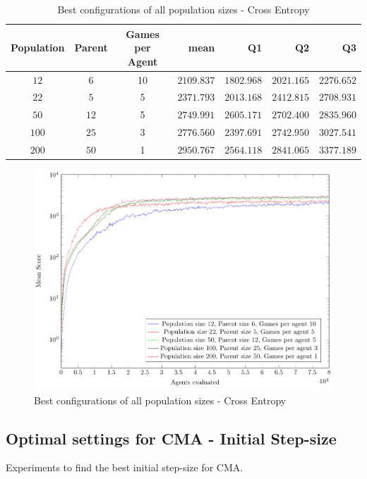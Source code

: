 \clearpage

\begin{table}[H]
\centering
\small
\begin{tabular}{c c c r r r r}
Population & Parent & Games per Agent & mean & Q1 & Q2 & Q3\\
\hline
$12$ & $6$ & 10 & $2109.837$ & $1802.968$ & $2021.165$ & $2276.652$\\
$22$ & $5$ & 5 & $2371.793$ & $2013.168$ & $2412.815$ & $2708.931$\\
$50$ & $12$ & 5 & $2749.991$ & $2605.171$ & $2702.400$ & $2835.960$\\
$100$ & $25$ & 3 & $2776.560$ & $2397.691$ & $2742.950$ & $3027.541$\\
$200$ & $50$ & 1 & $2950.767$ & $2564.118$ & $2841.065$ & $3377.189$\\
\end{tabular}
\caption{Best configurations of all population sizes - Cross Entropy}
\end{table}

\begin{figure}[H]
\centering
\includegraphics[scale=1]{data/ce_population_offspring/bestofall_population/PlotFile.pdf}
\caption{Best configurations of all population sizes - Cross Entropy}
\end{figure}

\clearpage

\subsection{Optimal settings for CMA - Initial Step-size \label{appendixCMAInitialSigma}}
Experiments to find the best initial step-size for CMA.

